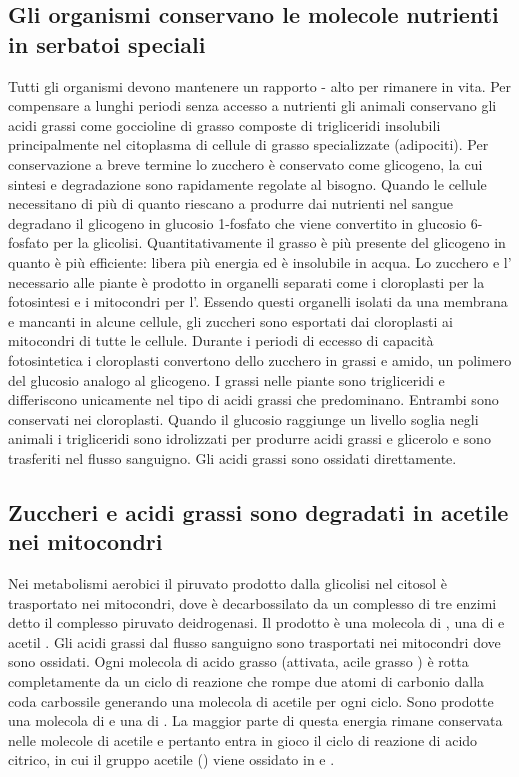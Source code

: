 \subsection{Gli organismi conservano le molecole nutrienti in serbatoi speciali}
Tutti gli organismi devono mantenere un rapporto - alto per rimanere in vita. Per compensare a lunghi periodi senza accesso a nutrienti gli animali conservano gli acidi
grassi come goccioline di grasso composte di trigliceridi insolubili principalmente nel citoplasma di cellule di grasso specializzate (adipociti). Per conservazione a breve termine lo 
zucchero \`e conservato come glicogeno, la cui sintesi e degradazione sono rapidamente regolate al bisogno. Quando le cellule necessitano di pi\`u  di quanto riescano a produrre
dai nutrienti nel sangue degradano il glicogeno in glucosio 1-fosfato che viene convertito in glucosio 6-fosfato per la glicolisi. Quantitativamente il grasso \`e pi\`u presente del
glicogeno in quanto \`e pi\`u efficiente: libera pi\`u energia ed \`e insolubile in acqua. Lo zucchero e l' necessario alle piante \`e prodotto in organelli separati
come i cloroplasti per la fotosintesi e i mitocondri per l'. Essendo questi organelli isolati da una membrana e mancanti in alcune cellule, gli zuccheri sono esportati dai 
cloroplasti ai mitocondri di tutte le cellule. Durante i periodi di eccesso di capacit\`a fotosintetica i cloroplasti convertono dello zucchero in grassi e amido, un polimero del
glucosio analogo al glicogeno. I grassi nelle piante sono trigliceridi e differiscono unicamente nel tipo di acidi grassi che predominano. Entrambi sono conservati nei cloroplasti. 
Quando il glucosio raggiunge un livello soglia negli animali i trigliceridi sono idrolizzati per produrre acidi grassi e glicerolo e sono trasferiti nel flusso sanguigno. Gli acidi 
grassi sono ossidati direttamente.
\subsection{Zuccheri e acidi grassi sono degradati in acetile  nei mitocondri}
Nei metabolismi aerobici il piruvato prodotto dalla glicolisi nel citosol \`e trasportato nei mitocondri, dove \`e decarbossilato da un complesso di tre enzimi detto il complesso 
piruvato deidrogenasi. Il prodotto \`e una molecola di , una di  e acetil . Gli acidi grassi dal flusso sanguigno sono trasportati nei mitocondri dove sono
ossidati. Ogni molecola di acido grasso (attivata, acile grasso ) \`e rotta completamente da un ciclo di reazione che rompe due atomi di carbonio dalla coda carbossile generando
una molecola di acetile  per ogni ciclo. Sono prodotte una molecola di  e una di . La maggior parte di questa energia rimane conservata nelle molecole di 
acetile  e pertanto entra in gioco il ciclo di reazione di acido citrico, in cui il gruppo acetile () viene ossidato in  e . 
